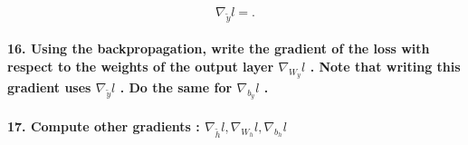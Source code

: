 \documentclass{article}
\theoremstyle{plain}%
\theoremstyle{definition}
\theoremstyle{remark}
\begin{document}
\[
    \nabla _{\tilde{y}}l = 
.\]

\paragraph{16. Using the backpropagation, write the gradient of the loss with respect to the weights of the output layer $ \nabla _{W_y}l $ . Note that writing this gradient uses $ \nabla _{\tilde{y}}l $ . Do the same for $ \nabla _{b_y}l $ .}

\paragraph{17. Compute other gradients : $ \nabla _{\tilde{h}} l, \nabla _{W_h} l, \nabla_{b_h}l $ }
\end{document}

